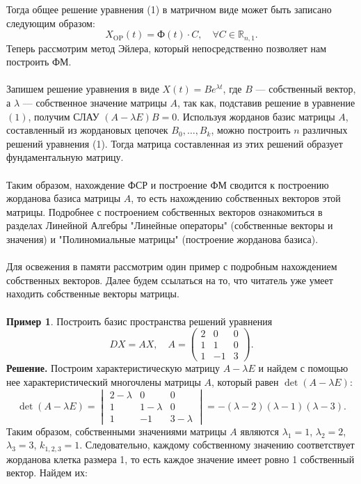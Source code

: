 \documentclass[a4paper, 12pt]{article}
\newcommand{\Rm}{\mathbb{R}}
\newcommand{\FI}{\text{Ф}}
\begin{document}
	Тогда общее решение уравнения (1) в матричном виде может быть записано следующим образом: $$X_{\text{OP}}(t) = \FI(t)\cdot C, \quad \forall C \in \Rm_{n,1}.$$
	Теперь рассмотрим метод Эйлера, который непосредственно позволяет нам построить ФМ.\\\\
	Запишем решение уравнения в виде $X(t) = Be^{\lambda t}$, где $B$ --- собственный вектор, а $\lambda$ --- собственное значение матрицы $A$, так как, подставив решение в уравнение $(1)$, получим СЛАУ $(A-\lambda E)B = 0$. Используя жорданов базис матрицы $A$, составленный из жордановых цепочек $B_0, \ldots, B_k$, можно построить $n$ различных решений уравнения (1). Тогда матрица составленная из этих решений образует фундаментальную матрицу.\\\\
	Таким образом, нахождение ФСР и построение ФМ сводится к построению жорданова базиса матрицы $A$, то есть нахождению собственных векторов этой матрицы. Подробнее с построением собственных векторов ознакомиться в разделах Линейной Алгебры "Линейные операторы" (собственные векторы и значения) и "Полиномиальные матрицы" (построение жорданова базиса).\\\\
	Для освежения в памяти рассмотрим один пример с подробным нахождением собственных векторов. Далее будем ссылаться на то, что читатель уже умеет находить собственные векторы матрицы.\\\\
	\textbf{Пример 1}. Построить базис пространства решений уравнения $$DX = AX, \quad A = \begin{pmatrix}
		2 & 0 & 0\\
		1 & 1 & 0\\
		1 & -1 & 3
	\end{pmatrix}.$$
\textbf{Решение.} Построим характеристическую матрицу $A - \lambda E$ и найдем с помощью нее характеристический многочлены матрицы $A$, который равен $\det (A - \lambda E)$:
$$\det(A - \lambda E) = \begin{vmatrix}
	2 - \lambda & 0 & 0\\
	1 & 1-\lambda & 0\\
	1 & -1 & 3 - \lambda
\end{vmatrix} = -(\lambda - 2)(\lambda-1)(\lambda -3).$$
Таким образом, собственными значениями матрицы $A$ являются $\lambda_1 = 1$, $\lambda_2 = 2$, $\lambda_3 = 3$, $k_{1,2,3} = 1$. Следовательно, каждому собственному значению соответствует жорданова клетка размера 1, то есть каждое значение имеет ровно 1 собственный вектор. Найдем их:
\end{document}
